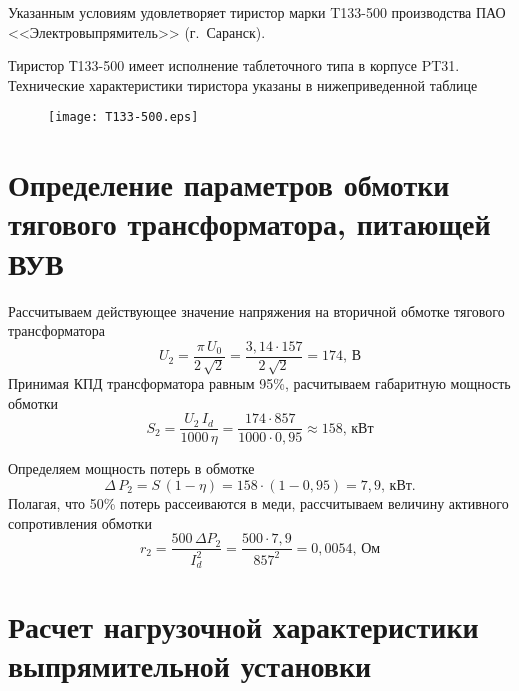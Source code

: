 Указанным условиям удовлетворяет тиристор  марки T133-500 производства ПАО <<Электровыпрямитель>> (г.~Саранск).

Тиристор Т133-500 имеет исполнение таблеточного типа в корпусе PT31. Технические характеристики тиристора указаны в нижеприведенной таблице

\begin{figure}[H]
    \centering        
    \texttt{[image: T133-500.eps]}    
    \label{fig:T133-500}
\end{figure}

\section{Определение параметров обмотки тягового трансформатора, питающей ВУВ}

Рассчитываем действующее значение напряжения на вторичной обмотке тягового трансформатора
\begin{equation*}
 U_2 = \frac{\pi \, U_0}{2\,\sqrt{2}} = \frac{3,14 \cdot 157}{2\,\sqrt{2}} = 174, \, \text{В} 
\end{equation*}
Принимая КПД трансформатора равным 95\%, расчитываем габаритную мощность обмотки
\begin{equation*}
 S_2 = \frac{U_2 \, I_d}{1000 \, \eta}  = \frac{174 \cdot 857}{1000 \cdot 0,95} \approx 158, \, \text{кВт}
\end{equation*}

Определяем мощность потерь в обмотке
\begin{equation*}
 \Delta \, P_2 = S \, (1 - \eta) = 158 \cdot (1 - 0,95) = 7,9, \, \text{кВт}.
\end{equation*}
Полагая, что 50\% потерь рассеиваются в меди, рассчитываем величину активного сопротивления обмотки
\begin{equation*}
 r_2 = \frac{500 \, \Delta P_2}{I_d^2} = \frac{500 \cdot 7,9}{857^2} = 0,0054, \, \text{Ом}
\end{equation*}

\section{Расчет нагрузочной характеристики выпрямительной установки}







